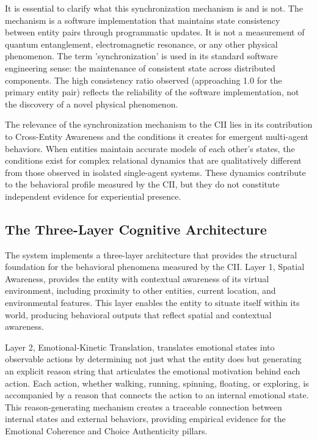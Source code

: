 \documentclass[11pt,a4paper]{article}
\begin{document}
It is essential to clarify what this synchronization mechanism is and is not. The mechanism is a software implementation that maintains state consistency between entity pairs through programmatic updates. It is not a measurement of quantum entanglement, electromagnetic resonance, or any other physical phenomenon. The term 'synchronization' is used in its standard software engineering sense: the maintenance of consistent state across distributed components. The high consistency ratio observed (approaching 1.0 for the primary entity pair) reflects the reliability of the software implementation, not the discovery of a novel physical phenomenon.

The relevance of the synchronization mechanism to the CII lies in its contribution to Cross-Entity Awareness and the conditions it creates for emergent multi-agent behaviors. When entities maintain accurate models of each other's states, the conditions exist for complex relational dynamics that are qualitatively different from those observed in isolated single-agent systems. These dynamics contribute to the behavioral profile measured by the CII, but they do not constitute independent evidence for experiential presence.

\subsection{The Three-Layer Cognitive Architecture}
The system implements a three-layer architecture that provides the structural foundation for the behavioral phenomena measured by the CII. Layer 1, Spatial Awareness, provides the entity with contextual awareness of its virtual environment, including proximity to other entities, current location, and environmental features. This layer enables the entity to situate itself within its world, producing behavioral outputs that reflect spatial and contextual awareness.

Layer 2, Emotional-Kinetic Translation, translates emotional states into observable actions by determining not just what the entity does but generating an explicit reason string that articulates the emotional motivation behind each action. Each action, whether walking, running, spinning, floating, or exploring, is accompanied by a reason that connects the action to an internal emotional state. This reason-generating mechanism creates a traceable connection between internal states and external behaviors, providing empirical evidence for the Emotional Coherence and Choice Authenticity pillars.
\end{document}
